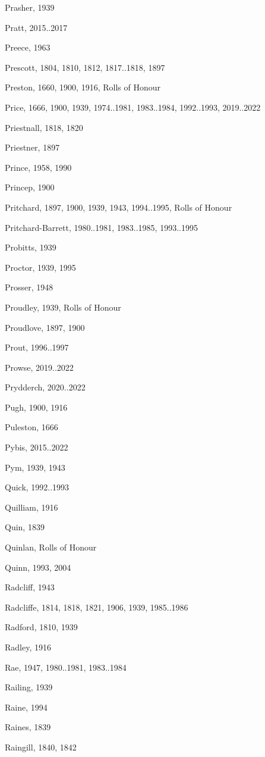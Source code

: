 \begin{theindex}
\item Prasher, 1939
\item Pratt, 2015..2017
\item Preece, 1963
\item Prescott, 1804, 1810, 1812, 1817..1818, 1897
\item Preston, 1660, 1900, 1916, Rolls of Honour
\item Price, 1666, 1900, 1939, 1974..1981, 1983..1984, 1992..1993, 2019..2022
\item Priestnall, 1818, 1820
\item Priestner, 1897
\item Prince, 1958, 1990
\item Princep, 1900
\item Pritchard, 1897, 1900, 1939, 1943, 1994..1995, Rolls of Honour
\item Pritchard-Barrett, 1980..1981, 1983..1985, 1993..1995
\item Probitts, 1939
\item Proctor, 1939, 1995
\item Prosser, 1948
\item Proudley, 1939, Rolls of Honour
\item Proudlove, 1897, 1900
\item Prout, 1996..1997
\item Prowse, 2019..2022
\item Prydderch, 2020..2022
\item Pugh, 1900, 1916
\item Puleston, 1666
\item Pybis, 2015..2022
\item Pym, 1939, 1943
\item Quick, 1992..1993
\item Quilliam, 1916
\item Quin, 1839
\item Quinlan, Rolls of Honour
\item Quinn, 1993, 2004
\item Radcliff, 1943
\item Radcliffe, 1814, 1818, 1821, 1906, 1939, 1985..1986
\item Radford, 1810, 1939
\item Radley, 1916
\item Rae, 1947, 1980..1981, 1983..1984
\item Railing, 1939
\item Raine, 1994
\item Raines, 1839
\item Raingill, 1840, 1842

\end{theindex}
